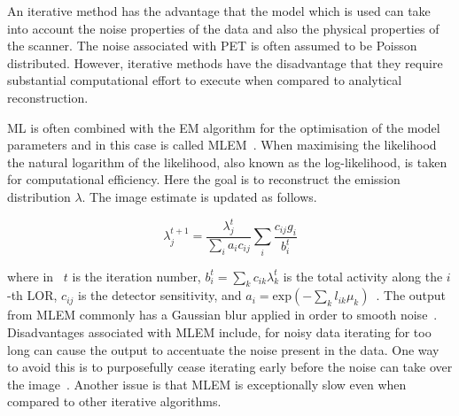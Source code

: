             An iterative method has the advantage that the model which is used can take into account the noise properties of the data and also the physical properties of the scanner. The noise associated with \gls{PET} is often assumed to be Poisson distributed. However, iterative methods have the disadvantage that they require substantial computational effort to execute when compared to analytical reconstruction.
            
            \gls{ML} is often combined with the \gls{EM} algorithm for the optimisation of the model parameters and in this case is called \gls{MLEM}~\parencite{MLEMBib, PETMLEMBib, PETMLEM2Bib}. When maximising the likelihood the natural logarithm of the likelihood, also known as the log-likelihood, is taken for computational efficiency. Here the goal is to reconstruct the emission distribution $\lambda$. The image estimate is updated as follows.

            \begin{equation} \label{eq:mlem_update}
                \lambda_{j}^{t+1}=\frac{\lambda_{j}^t}{\sum_{i}a_{i}c_{ij}}\sum_{i}\frac{c_{ij}g_{i}}{b_{i}^t}
            \end{equation}

            \noindent where in~ $t$ is the iteration number, $b_i^t = \sum_k c_{ik}\lambda_{k}^t$ is the total activity along the $i$-th \gls{LOR}, $c_{ij}$ is the detector sensitivity, and $a_i =\mathrm{exp}(-\sum_k l_{ik} \mu_{k})$~\parencite{Brusaferri2020ImprovingInformation}. The output from \gls{MLEM} commonly has a Gaussian blur applied in order to smooth noise~\parencite{PETMLEMFiltBib}. Disadvantages associated with \gls{MLEM} include, for noisy data iterating for too long can cause the output to accentuate the noise present in the data. One way to avoid this is to purposefully cease iterating early before the noise can take over the image~\parencite{PETMLEMTerminationBib}. Another issue is that \gls{MLEM} is exceptionally slow even when compared to other iterative algorithms. %
            
